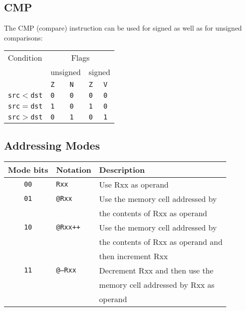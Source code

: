 \documentclass{leaflet}
\begin{document}
  \subsection{CMP}
   The CMP (compare) instruction can be used for signed as well as for unsigned
   comparisons:
   \begin{center}
    \vspace*{-2mm}
{\scriptsize
    \begin{longtable}{|l|l|l|l|l|}
     \hline
     Condition&\multicolumn{4}{|c|}{Flags}\\
              &\multicolumn{2}{|c|}{unsigned}&\multicolumn{2}{|c|}{signed}\\
              &\texttt{Z}&\texttt{N}&\texttt{Z}&\texttt{V}\\
     \hline
     \hline
     \texttt{src}$<$\texttt{dst}&\texttt{0}&\texttt{0}&\texttt{0}&\texttt{0}\\
     \texttt{src}$=$\texttt{dst}&\texttt{1}&\texttt{0}&\texttt{1}&\texttt{0}\\
     \texttt{src}$>$\texttt{dst}&\texttt{0}&\texttt{1}&\texttt{0}&\texttt{1}\\
     \hline
    \end{longtable}
}
    \vspace*{-8mm}
   \end{center}
%
  \subsection{Addressing Modes}
   {\scriptsize
    \begin{center}
     \begin{longtable}{|c|l|l|}
      \hline
       Mode bits&Notation&Description\\
      \hline
      \hline
       {\tt 00}&{\tt Rxx}&Use Rxx as operand\\
       {\tt 01}&{\tt @Rxx}&Use the memory cell addressed by\\
               &          &the contents of Rxx as operand\\
       {\tt 10}&{\tt @Rxx++}&Use the memory cell addressed by\\
               &          &the contents of Rxx as operand and\\
               &          &then increment Rxx\\
       {\tt 11}&{\tt @--Rxx}&Decrement Rxx and then use the\\
               &          &memory cell addressed by Rxx as\\
               &          &operand\\
      \hline
     \end{longtable}
    \end{center}
   }
   \vspace*{-10mm}
%
\end{document}
